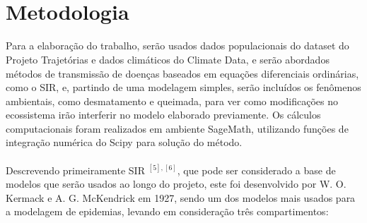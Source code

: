\documentclass[12pt]{article}
\begin{document}
\\\\





\section{Metodologia}

Para a elaboração do trabalho, serão usados dados populacionais do dataset do Projeto Trajetórias e dados climáticos do Climate Data, e serão abordados métodos de transmissão de doenças baseados em equações diferenciais ordinárias, como o SIR, e, partindo de uma modelagem simples, serão incluídos os fenômenos ambientais, como desmatamento e queimada, para ver como modificações no ecossistema irão interferir no modelo elaborado previamente. Os cálculos computacionais foram realizados em ambiente SageMath, utilizando funções de integração numérica do Scipy para solução do método.
\\\\
Descrevendo primeiramente SIR $^{[5], [6]}$, que pode ser considerado a base de modelos que serão usados ao longo do projeto, este foi desenvolvido por W. O. Kermack e A. G. McKendrick em 1927, sendo um dos modelos mais usados para a modelagem de epidemias, levando em consideração três compartimentos:
\end{document}
